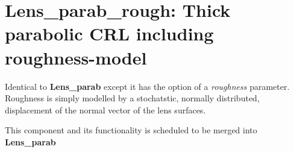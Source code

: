 \section{Lens\_parab\_rough: Thick parabolic CRL including roughness-model}

Identical to \textbf{Lens\_parab} except it has the option of a \textit{roughness} parameter.
Roughness is simply modelled by a stochatstic, normally distributed, displacement of the normal vector of the lens surfaces.

This component and its functionality is scheduled to be merged into \textbf{Lens\_parab}
